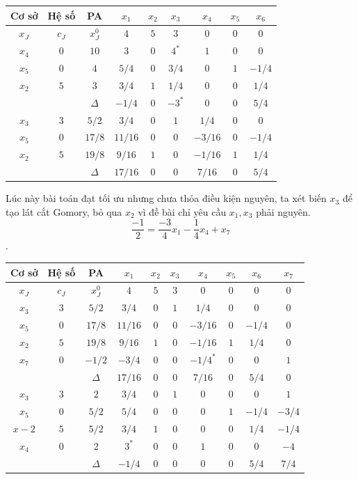 \documentclass[12pt,a4paper]{report}
\begin{document}
    \begin{center}
        \begin{tabular}{|c|c|c|c|c|c|c|c|c|}
        \hline
          Cơ sở & Hệ số & PA& $x_1$ &$x_2$ &$x_3$ &$x_4$ &$x_5$ &$x_6$  \\
         \hline
          $x_J$& $c_J$ &$x_J^0$ &$4$ &$5$ &$ 3$ &$0$ &$0$ &$0$\\
          \hline    
          $x_4$ & $0$ &$10$ &$3$ &$0$ &$4^*$ &$1$ &$0$ &$0$ \\
          $x_5$ &$0$ &$4$ &$5/4$ &$0$ &$3/4$ &$0$ &$1$ &$-1/4$\\
          $x_2$ &$5$ &$3$ &$3/4$ &$1$ &$1/4$ &$0$ &$0$ &$1/4$\\
          \hline
          &&$\Delta$ &$-1/4$ &$0$ &$-3^*$ &$0$ &$0$ &$5/4$\\
          \hline
          $x_3$ &$3$ &$5/2$ &$3/4$ &$0$ &$1$ &$1/4$ &$0$ &$0$\\
          $x_5$ &$0$ &$17/8$ &$11/16$ &$0$ &$0$ &$-3/16$ &$0$ &$-1/4$\\
          $x_2$ &$5$ &$19/8$ &$9/16$ &$1$ &$0$ &$-1/16$ &$1$ &$1/4$\\
          \hline
          &&$\Delta$ &$17/16$ &$0$ &$0$ &$7/16$ &$0$ &$5/4$\\
          \hline
         \end{tabular}
    \end{center}
    Lúc này bài toán đạt tối ưu nhưng chưa thỏa điều kiện nguyên, ta xét biến $x_3$ để tạo lát cắt Gomory, bỏ qua $x_2$ vì đề bài chỉ yêu cầu $x_1,x_3$ phải nguyên.
    $$\dfrac{-1}{2}=\dfrac{-3}{4}x_1 -\dfrac{1}{4}x_4 +x_7$$.
    \begin{center}
        \begin{tabular}{|c|c|c|c|c|c|c|c|c|c|}
        \hline
         Cơ sở & Hệ số & PA& $x_1$ &$x_2$ &$x_3$ &$x_4$ &$x_5$ &$x_6$ &$x_7$ \\
         \hline
          $x_J$& $c_J$ &$x_J^0$ &$4$ &$5$ &$ 3$ &$0$ &$0$ &$0$ &$0$\\
          \hline
           $x_3$ &$3$ &$5/2$ &$3/4$ &$0$ &$1$ &$1/4$ &$0$ &$0$ &$0$\\
          $x_5$ &$0$ &$17/8$ &$11/16$ &$0$ &$0$ &$-3/16$ &$0$ &$-1/4$ &$0$\\
          $x_2$ &$5$ &$19/8$ &$9/16$ &$1$ &$0$ &$-1/16$ &$1$ &$1/4$ &$0$\\
          $x_7$ &$0$ &$-1/2$ &$-3/4$ &$0$ &$0$ &$-1/4^*$ &$0$ &$0$ &$1$\\
          \hline
          &&$\Delta$ &$17/16$ &$0$ &$0$ &$7/16$ &$0$ &$5/4$ &$0$\\
          \hline
          $x_3$ &$3$ &$2$ &$3/4$ &$0$ &$1$ &$0$ &$0$ &$0$ &$1$\\
          $x_5$ &$0$ &$5/2$ &$5/4$ &$0$ &$0$ &$0$ &$1$ &$-1/4$ &$-3/4$\\
          $x-2$ &$5$ &$5/2$ &$3/4$ &$1$ &$0$ &$0$ &$0$ &$1/4$ &$-1/4$\\
          $x_4$ &$0$ &$2$ &$3^*$ &$0$ &$0$ &$1$ &$0$ &$0$ &$-4$\\
          \hline
          &&$\Delta$&$-1/4$ &$0$ &$0$ &$0$ &$0$ &$5/4$ &$7/4$\\
          \hline
          \end{tabular}
    \end{center}    
\end{document}
